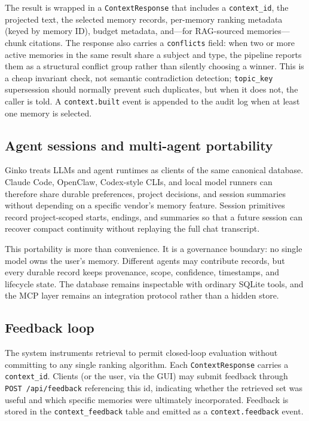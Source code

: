 \documentclass[11pt,a4paper]{article}
\begin{document}
The result is wrapped in a \texttt{ContextResponse} that includes a \texttt{context\_id}, the projected text, the selected memory records, per-memory ranking metadata (keyed by memory ID), budget metadata, and---for RAG-sourced memories---chunk citations. The response also carries a \texttt{conflicts} field: when two or more active memories in the same result share a subject and type, the pipeline reports them as a structural conflict group rather than silently choosing a winner. This is a cheap invariant check, not semantic contradiction detection; \texttt{topic\_key} supersession should normally prevent such duplicates, but when it does not, the caller is told. A \texttt{context.built} event is appended to the audit log when at least one memory is selected.

\subsection{Agent sessions and multi-agent portability}

Ginko treats LLMs and agent runtimes as clients of the same canonical database. Claude Code, OpenClaw, Codex-style CLIs, and local model runners can therefore share durable preferences, project decisions, and session summaries without depending on a specific vendor's memory feature. Session primitives record project-scoped starts, endings, and summaries so that a future session can recover compact continuity without replaying the full chat transcript.

This portability is more than convenience. It is a governance boundary: no single model owns the user's memory. Different agents may contribute records, but every durable record keeps provenance, scope, confidence, timestamps, and lifecycle state. The database remains inspectable with ordinary SQLite tools, and the MCP layer remains an integration protocol rather than a hidden store.

\subsection{Feedback loop}

The system instruments retrieval to permit closed-loop evaluation without committing to any single ranking algorithm. Each \texttt{ContextResponse} carries a \texttt{context\_id}. Clients (or the user, via the GUI) may submit feedback through \texttt{POST /api/feedback} referencing this id, indicating whether the retrieved set was useful and which specific memories were ultimately incorporated. Feedback is stored in the \texttt{context\_feedback} table and emitted as a \texttt{context.feedback} event.
\end{document}
